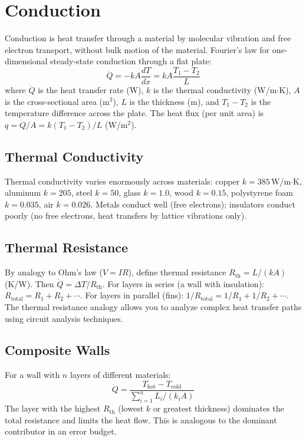 \documentclass[11pt,letterpaper,twoside,openany]{book}
\begin{document}
\section{Conduction}
Conduction is heat transfer through a material by molecular vibration and free electron transport, without bulk motion of the material. Fourier's law for one-dimensional steady-state conduction through a flat plate:
\begin{equation}
\dot{Q} = -kA\frac{dT}{dx} = kA\frac{T_1 - T_2}{L}
\end{equation}
where $\dot{Q}$ is the heat transfer rate (W), $k$ is the thermal conductivity (W/m$\cdot$K), $A$ is the cross-sectional area (m$^2$), $L$ is the thickness (m), and $T_1 - T_2$ is the temperature difference across the plate. The heat flux (per unit area) is $q = \dot{Q}/A = k(T_1 - T_2)/L$ (W/m$^2$).

\subsection{Thermal Conductivity}
Thermal conductivity varies enormously across materials: copper $k = 385$\,W/m$\cdot$K, aluminum $k = 205$, steel $k = 50$, glass $k = 1.0$, wood $k = 0.15$, polystyrene foam $k = 0.035$, air $k = 0.026$. Metals conduct well (free electrons); insulators conduct poorly (no free electrons, heat transfers by lattice vibrations only).

\subsection{Thermal Resistance}
By analogy to Ohm's law ($V = IR$), define thermal resistance $R_{\text{th}} = L/(kA)$ (K/W). Then $\dot{Q} = \Delta T / R_{\text{th}}$. For layers in series (a wall with insulation): $R_{\text{total}} = R_1 + R_2 + \cdots$. For layers in parallel (fins): $1/R_{\text{total}} = 1/R_1 + 1/R_2 + \cdots$. The thermal resistance analogy allows you to analyze complex heat transfer paths using circuit analysis techniques.

\subsection{Composite Walls}
For a wall with $n$ layers of different materials:
\begin{equation}
\dot{Q} = \frac{T_{\text{hot}} - T_{\text{cold}}}{\sum_{i=1}^{n} L_i/(k_i A)}
\end{equation}
The layer with the highest $R_{\text{th}}$ (lowest $k$ or greatest thickness) dominates the total resistance and limits the heat flow. This is analogous to the dominant contributor in an error budget.
\end{document}
